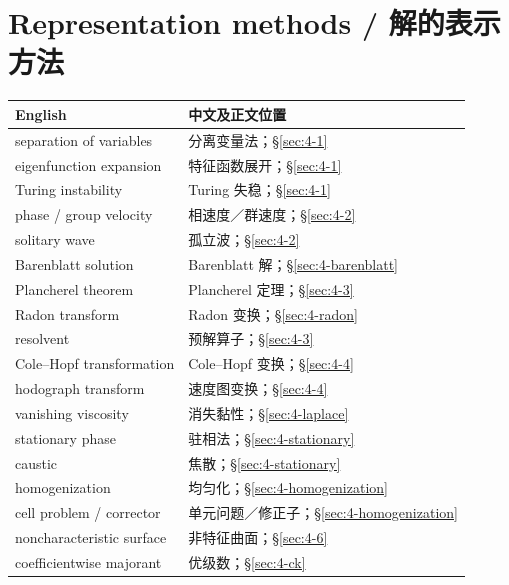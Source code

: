 \section*{Representation methods / 解的表示方法}
\begin{center}\small
\begin{tabular}{@{}p{.53\linewidth}p{.38\linewidth}@{}}
\textbf{English}&\textbf{中文及正文位置}\\\hline
separation of variables & 分离变量法；\S\ref{sec:4-1}\\
eigenfunction expansion & 特征函数展开；\S\ref{sec:4-1}\\
Turing instability & Turing 失稳；\S\ref{sec:4-1}\\
phase / group velocity & 相速度／群速度；\S\ref{sec:4-2}\\
solitary wave & 孤立波；\S\ref{sec:4-2}\\
Barenblatt solution & Barenblatt 解；\S\ref{sec:4-barenblatt}\\
Plancherel theorem & Plancherel 定理；\S\ref{sec:4-3}\\
Radon transform & Radon 变换；\S\ref{sec:4-radon}\\
resolvent & 预解算子；\S\ref{sec:4-3}\\
Cole--Hopf transformation & Cole--Hopf 变换；\S\ref{sec:4-4}\\
hodograph transform & 速度图变换；\S\ref{sec:4-4}\\
vanishing viscosity & 消失黏性；\S\ref{sec:4-laplace}\\
stationary phase & 驻相法；\S\ref{sec:4-stationary}\\
caustic & 焦散；\S\ref{sec:4-stationary}\\
homogenization & 均匀化；\S\ref{sec:4-homogenization}\\
cell problem / corrector & 单元问题／修正子；\S\ref{sec:4-homogenization}\\
noncharacteristic surface & 非特征曲面；\S\ref{sec:4-6}\\
coefficientwise majorant & 优级数；\S\ref{sec:4-ck}
\end{tabular}
\end{center}

